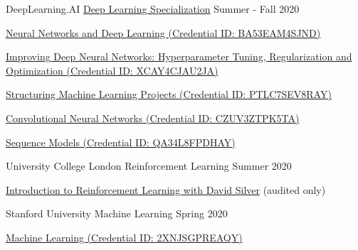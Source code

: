 \begin{cventries}
  \cventry
    {DeepLearning.AI} %
    {\href{https://www.coursera.org/account/accomplishments/specialization/certificate/3DWHZC46YSCK}{Deep Learning Specialization}} %
    {} %
    {Summer - Fall 2020} %
    {
      \begin{cvitems} %
      	\item {\href{https://www.coursera.org/account/accomplishments/certificate/BA53EAM4SJND}{Neural Networks and Deep Learning (Credential ID: BA53EAM4SJND)}}
      	\item {\href{https://www.coursera.org/account/accomplishments/certificate/XCAY4CJAU2JA}{Improving Deep Neural Networks: Hyperparameter Tuning, Regularization and Optimization (Credential ID: XCAY4CJAU2JA)}}
      	\item {\href{https://www.coursera.org/account/accomplishments/certificate/PTLC7SEV8RAY}{Structuring Machine Learning Projects (Credential ID: PTLC7SEV8RAY)}}
      	\item {\href{https://www.coursera.org/account/accomplishments/certificate/CZUV3ZTPK5TA}{Convolutional Neural Networks (Credential ID: CZUV3ZTPK5TA)}}
      	\item {\href{https://www.coursera.org/account/accomplishments/certificate/QA34L8FPDHAY}{Sequence Models (Credential ID: QA34L8FPDHAY)}}
      \end{cvitems}
    }

  \cventry
    {University College London} %
    {Reinforcement Learning} %
    {} %
    {Summer 2020} %
    {
      \begin{cvitems} %
      	\item {\href{https://www.youtube.com/watch?v=2pWv7GOvuf0&list=PLqYmG7hTraZBiG_XpjnPrSNw-1XQaM_gB}{Introduction to Reinforcement Learning with David Silver} (audited only)}
      \end{cvitems}
    }

  \cventry
    {Stanford University} %
    {Machine Learning} %
    {} %
    {Spring 2020} %
    {
      \begin{cvitems} %
      	\item {\href{https://www.coursera.org/account/accomplishments/certificate/2XNJSGPREAQY}{Machine Learning (Credential ID: 2XNJSGPREAQY)}}
      \end{cvitems}
    }
    
\end{cventries}
